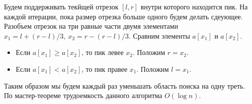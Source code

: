 		\item Будем поддерживать текйщей отрезок $[l, r]$ внутри которого находится пик. На каждой итерации, пока размер отрезка больше одного будем делать сдеующее. Разобъем отрезок на три равные части двумя элементами $x_1 = l+(r-l)/3,\ x_2 = r - (r-l)/3$. Сравним элементы $a[x_1]$ и $a[x_2]$.\\
		\begin{itemize}
			\item Если $a[x_1] \ge a[x_2]$, то пик левее $x_2$. Положим $r=x_2$.
			\item Если $a[x_1] < a[x_2]$, то пик правее $x_1$. Положим $l=x_1$.
		\end{itemize}
		Таким образом мы будем каждый раз уменьшать область поиска на одну треть. По мастер-теореме трудоемкость данного алгоритма $O(\log n)$.
		\item 